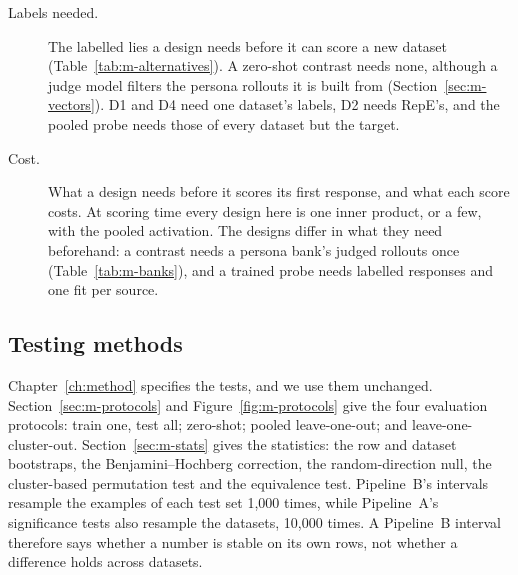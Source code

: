 \begin{description}
\item[Labels needed.] The labelled lies a design needs before it can score a new dataset (Table~\ref{tab:m-alternatives}).
A zero-shot contrast needs none, although a judge model filters the persona rollouts it is built from (Section~\ref{sec:m-vectors}).
D1 and D4 need one dataset's labels, D2 needs RepE's, and the pooled probe needs those of every dataset but the target.
\item[Cost.] What a design needs before it scores its first response, and what each score costs.
At scoring time every design here is one inner product, or a few, with the pooled activation. %
The designs differ in what they need beforehand: a contrast needs a persona bank's judged rollouts once (Table~\ref{tab:m-banks}), and a trained probe needs labelled responses and one fit per source.
\end{description}

\subsection{Testing methods}
\label{sec:r-testing}

Chapter~\ref{ch:method} specifies the tests, and we use them unchanged.
Section~\ref{sec:m-protocols} and Figure~\ref{fig:m-protocols} give the four evaluation protocols: train one, test all; zero-shot; pooled leave-one-out; and leave-one-cluster-out.
Section~\ref{sec:m-stats} gives the statistics: the row and dataset bootstraps, the Benjamini--Hochberg correction, the random-direction null, the cluster-based permutation test and the equivalence test.
Pipeline~B's intervals resample the examples of each test set 1{,}000 times, while Pipeline~A's significance tests also resample the datasets, 10{,}000 times. %
A Pipeline~B interval therefore says whether a number is stable on its own rows, not whether a difference holds across datasets. %

